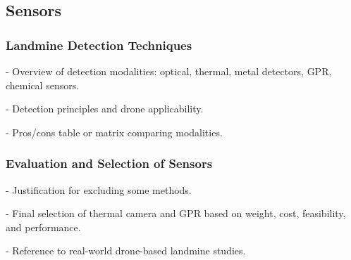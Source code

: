 \subsection{Sensors}

\subsubsection{Landmine Detection Techniques}
- Overview of detection modalities: optical, thermal, metal detectors, GPR, chemical sensors.

- Detection principles and drone applicability.

- Pros/cons table or matrix comparing modalities.

\subsubsection{Evaluation and Selection of Sensors}
- Justification for excluding some methods.

- Final selection of thermal camera and GPR based on weight, cost, feasibility, and performance.

- Reference to real-world drone-based landmine studies.
